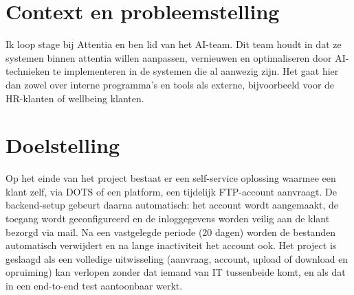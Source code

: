 

\section{Context en probleemstelling}%
\label{vst:context}


Ik loop stage bij Attentia en ben lid van het AI-team. Dit team houdt in dat ze systemen binnen attentia willen aanpassen, vernieuwen en optimaliseren door AI-technieken te implementeren in de systemen die al aanwezig zijn. Het gaat hier dan zowel over interne programma's en tools als externe, bijvoorbeeld voor de HR-klanten of wellbeing klanten.


\section{Doelstelling}%
\label{vst:doelstelling}


Op het einde van het project bestaat er een self-service oplossing waarmee een klant zelf, via DOTS of een platform, een tijdelijk FTP-account aanvraagt. De backend-setup gebeurt daarna automatisch: het account wordt aangemaakt, de toegang wordt geconfigureerd en de inloggegevens worden veilig aan de klant bezorgd via mail. Na een vastgelegde periode (20 dagen) worden de bestanden automatisch verwijdert en na lange inactiviteit het account ook. Het project is geslaagd als een volledige uitwisseling (aanvraag, account, upload of download en opruiming) kan verlopen zonder dat iemand van IT tussenbeide komt, en als dat in een end-to-end test aantoonbaar werkt.


